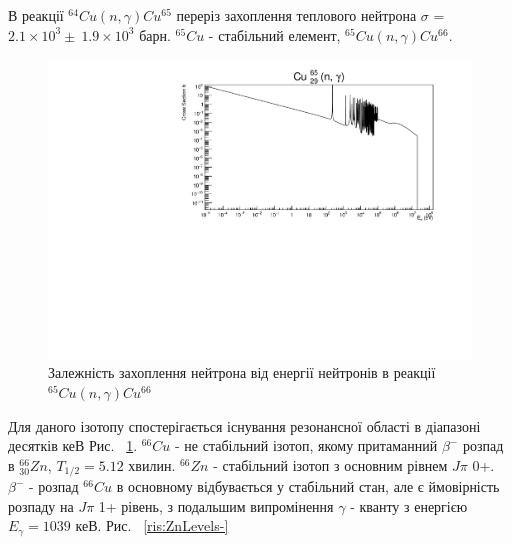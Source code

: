 \documentclass[a4paper, 14pt]{article}
\numberwithin{equation}{section}
\numberwithin{table}{section}
\begin{document}
В реакції $^{64}Cu(n, \gamma)Cu^{65}$ переріз захоплення теплового нейтрона $\sigma$ = $2.1 \times 10^3 \pm \ 1.9 \times 10^3$ барн. $^{65}Cu$ - стабільний елемент, $^{65}Cu(n,\gamma)Cu^{66}$.
\begin{figure}[hbt!]
	\centering \includegraphics[width=1\textwidth]{sigma/Cu65Sigma.pdf}
	\caption{Залежність захоплення нейтрона від енергії нейтронів в реакції $^{65}Cu(n,\gamma)Cu^{66}$} 
	\label{ris:CuSigma}	
\end{figure} 
Для даного ізотопу спостерігається існування резонансної області в діапазоні десятків кеВ Рис. ~\ref{ris:CuSigma}. 
$^{66}Cu$ - не стабільний ізотоп, якому притаманний $\beta^-$ розпад в  $^{66}_{30}Zn$, $T_{1/2} = 5.12$ хвилин. 
$^{66}Zn$ - стабільний ізотоп з основним рівнем $J\pi$ 0+. $\beta^-$ - розпад $^{66}Cu$ в основному відбувається у стабільний стан, але є ймовірність розпаду на $J\pi$ 1+ рівень, з подальшим випромінення $\gamma$ - кванту з енергією $E_{\gamma} = 1039$ кеВ. Рис. ~\ref{ris:ZnLevels-}
\\
\end{document}
